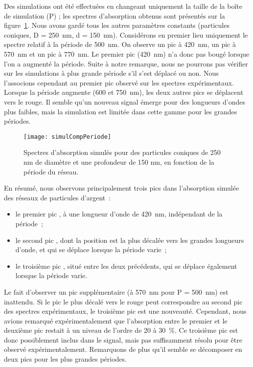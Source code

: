 Des simulations ont été effectuées en changeant uniquement la taille de la boîte de simulation (P) ; les spectres d’absorption obtenus sont présentés sur la figure~\ref{simulCompPeriode}. Nous avons gardé tous les autres paramètres constants (particules coniques, D = 250~nm, d = 150~nm). Considérons en premier lieu uniquement le spectre relatif à la période de 500~nm. On observe un pic à 420~nm, un pic à 570~nm et un pic à 770~nm. Le premier pic (420~nm) n’a donc pas bougé lorsque l’on a augmenté la période. Suite à notre remarque, nous ne pourrons pas vérifier sur les simulations à plus grande période s'il s'est déplacé ou non. Nous l'associons cependant au \og premier pic \fg{} observé sur les spectres expérimentaux. Lorsque la période augmente (600 et 750~nm), les deux autres pics se déplacent vers le rouge. Il semble qu'un nouveau signal émerge pour des longueurs d'ondes plus faibles, mais la simulation est limitée dans cette gamme pour les grandes périodes.\par 
\begin{figure}[!htb]
\centering
\texttt{[image: simulCompPeriode]}
\caption{Spectres d’absorption simulés pour des particules coniques de 250 nm de diamètre et une profondeur de 150 nm, en fonction de la période du réseau.}
\label{simulCompPeriode}
\end{figure}
En résumé, nous observons principalement trois pics dans l'absorption simulée des réseaux de particules d'argent~:
\begin{itemize}
\item le \og premier pic \fg, à une longueur d'onde de 420~nm, indépendant de la période~;
\item le \og second pic \fg, dont la position est la plus décalée vers les grandes longueurs d'onde, et qui se déplace lorsque la période varie~;
\item le \og troisième pic \fg, situé entre les deux précédents, qui se déplace également lorsque la période varie. 
\end{itemize}
Le fait d'observer un pic supplémentaire (à 570~nm pour P = 500~nm) est inattendu. Si le pic le plus décalé vers le rouge peut correspondre au \og second pic \fg{} des spectres expérimentaux, le \og troisième pic \fg{} est une nouveauté. Cependant, nous avions remarqué expérimentalement que l'absorption entre le premier et le deuxième pic restait à un niveau de l'ordre de 20 à 30~\%. Ce troisième pic est donc possiblement inclus dans le signal, mais pas suffisamment résolu pour être observé expérimentalement. Remarquons de plus qu'il semble se décomposer en deux pics pour les plus grandes périodes.\par
